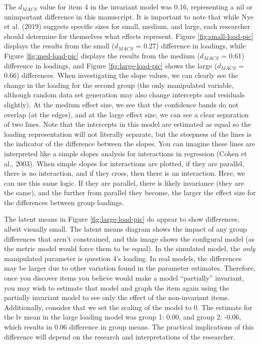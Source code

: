 \documentclass[
  man]{apa7}
\begin{document}
The \(d_{MACS}\) value for item 4 in the invariant model was 0.16, representing a nil or unimportant difference in this manuscript. It is important to note that while Nye et al. (2019) suggests specific sizes for small, medium, and large, each researcher should determine for themselves what effects represent. Figure \ref{fig:small-load-pic} displays the results from the small (\(d_{MACS}\) = 0.27) difference in loadings, while Figure \ref{fig:med-load-pic} displays the results from the medium (\(d_{MACS}\) = 0.61) difference in loadings, and Figure \ref{fig:large-load-pic} shows the large (\(d_{MACS}\) = 0.66) differences. When investigating the slope values, we can clearly see the change in the loading for the second group (the only manipulated variable, although random data set generation may also change intercepts and residuals slightly). At the medium effect size, we see that the confidence bands do not overlap (at the edges), and at the large effect size, we can see a clear separation of two lines. Note that the intercepts in this model are estimated as equal so the loading representation will not literally separate, but the steepness of the lines is the indicator of the difference between the slopes. You can imagine these lines are interpreted like a simple slopes analysis for interactions in regression (Cohen et al., 2003). When simple slopes for interactions are plotted, if they are parallel, there is no interaction, and if they cross, then there is an interaction. Here, we can use this same logic. If they are parallel, there is likely invariance (they are the same), and the further from parallel they become, the larger the effect size for the differences between group loadings.

The latent means in Figure \ref{fig:large-load-pic} do appear to show differences, albeit visually small. The latent means diagram shows the impact of any group differences that aren't constrained, and this image shows the configural model (as the metric model would force them to be equal). In the simulated model, the \emph{only} manipulated parameter is question 4's loading. In real models, the differences may be larger due to other variation found in the parameter estimates. Therefore, once you discover items you believe would make a model ``partially'' invariant, you may wish to estimate that model and graph the item again using the partially invariant model to see only the effect of the non-invariant items. Additionally, consider that we set the scaling of the model to 0. The estimate for the lv mean in the large loading model was group 1: 0.00, and group 2: -0.06, which results in 0.06 difference in group means. The practical implications of this difference will depend on the research and interpretations of the researcher.
\end{document}
